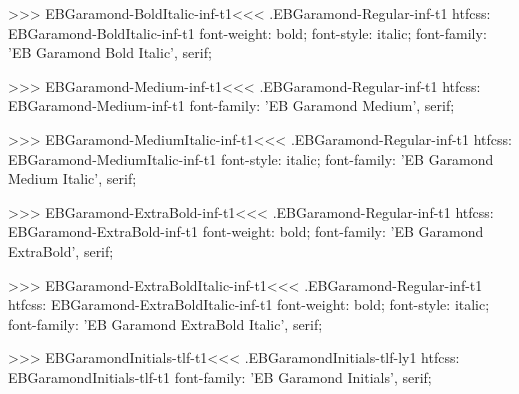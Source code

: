 {{{{{{{>>>
\<EBGaramond-BoldItalic-inf-t1\><<<
.EBGaramond-Regular-inf-t1
htfcss:  EBGaramond-BoldItalic-inf-t1  font-weight: bold; font-style: italic; font-family: 'EB Garamond Bold Italic', serif;

>>>
\<EBGaramond-Medium-inf-t1\><<<
.EBGaramond-Regular-inf-t1
htfcss:  EBGaramond-Medium-inf-t1  font-family: 'EB Garamond Medium', serif;

>>>
\<EBGaramond-MediumItalic-inf-t1\><<<
.EBGaramond-Regular-inf-t1
htfcss:  EBGaramond-MediumItalic-inf-t1  font-style: italic; font-family: 'EB Garamond Medium Italic', serif;

>>>
\<EBGaramond-ExtraBold-inf-t1\><<<
.EBGaramond-Regular-inf-t1
htfcss:  EBGaramond-ExtraBold-inf-t1  font-weight: bold; font-family: 'EB Garamond ExtraBold', serif;

>>>
\<EBGaramond-ExtraBoldItalic-inf-t1\><<<
.EBGaramond-Regular-inf-t1
htfcss:  EBGaramond-ExtraBoldItalic-inf-t1  font-weight: bold; font-style: italic; font-family: 'EB Garamond ExtraBold Italic', serif;

>>>
\<EBGaramondInitials-tlf-t1\><<<
.EBGaramondInitials-tlf-ly1
htfcss:  EBGaramondInitials-tlf-t1  font-family: 'EB Garamond Initials', serif;

}}}}}}}
